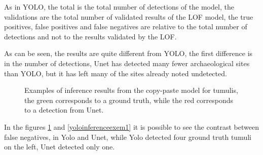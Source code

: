 As in YOLO, the total is the total number of detections of the model, the validations are the total number of validated results of the LOF model, the true positives, false positives and false negatives are relative to the total number of detections and not to the results validated by the LOF.

As can be seen, the results are quite different from YOLO, the first difference is in the number of detections, Unet has detected many fewer archaeological sites than YOLO, but it has left many of the sites already noted undetected.

\begin{figure}[H]
    \centering
    \qquad
    \caption{Examples of inference results from the copy-paste model for tumulis, the green corresponds to a ground truth, while the red corresponds to a detection from Unet.}%
    \label{fig:unet4mamoas}
\end{figure}

In the figures \ref{fig:unet4mamoas} and  \ref{yoloinferenceexem1} it is possible to see the contrast between false negatives, in Yolo and Unet, while Yolo detected four ground truth tumuli on the left, Unet detected only one.

